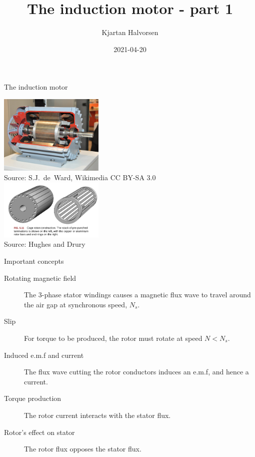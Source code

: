 \documentclass[dvisvgm,hypertex,aspectratio=169]{beamer}
\author{Kjartan Halvorsen}
\date{2021-04-20}
\title{The induction motor - part 1}
\begin{document}
\maketitle


\begin{frame}{The induction motor}

  \begin{center}
    \includegraphics[width=5cm]{wikimedia-induction-motor.jpeg}\\
    {\footnotesize Source: S.J.~de~Ward, Wikimedia CC BY-SA 3.0}\\
    \includegraphics[width=5cm]{HD-fig5_11.png}\\
    {\footnotesize Source: Hughes and Drury}\\
  \end{center}

\end{frame}


\begin{frame}{Important concepts}

  \begin{description}
    \item[Rotating magnetic field] The 3-phase stator windings causes a magnetic flux wave to travel around the air gap at synchronous speed, $N_s$.
    \item[Slip] For torque to be produced, the rotor must rotate at speed $N < N_s$. 
    \item[Induced e.m.f and current] The flux wave cutting the rotor conductors induces an e.m.f, and hence a current.
    \item[Torque production] The rotor current interacts with the stator flux.
    \item[Rotor's effect on stator] The rotor flux opposes the stator flux.
  \end{description}

\end{frame}
\end{document}
